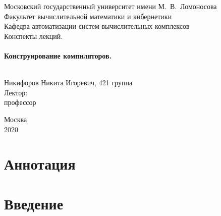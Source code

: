 \documentclass[a4paper, 12pt, titlepage, finall]{extreport}
\begin{document}
    \begin{titlepage}
        \begin{center}
            {\small \sc Московский государственный университет имени М.~В.~Ломоносова\\
            Факультет вычислительной математики и кибернетики\\
            Кафедра автоматизации систем вычислительных комплексов\\}
            \vfill
            {\large \sc Конспекты лекций.}\\~\\

            {\large \bf Конструирование компиляторов.}\\~\\

        \end{center}
        
        \begin{flushright}
            \vfill
            \vfill
            {Никифоров Никита Игоревич, 421 группа}\\
            {Лектор:}\\
            {профессор }\\
        \end{flushright}

        \begin{center}
            \vfill
            {\small Москва\\2020}
        \end{center}
    \end{titlepage}

    \chapter*{Аннотация}
    \newpage
    \tableofcontents
    \newpage
    \chapter*{Введение}
        
\end{document}
